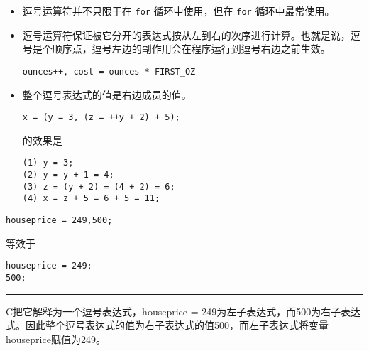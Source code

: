 \begin{frame}[fragile]\ft{\secname}
\begin{itemize}
\item
 逗号运算符并不只限于在 \lstinline|for| 循环中使用，但在 \lstinline|for| 循环中最常使用。
\end{itemize}
\end{frame}


\begin{frame}[fragile]\ft{\secname}
\begin{itemize}
\item
逗号运算符保证被它分开的表达式按从左到右的次序进行计算。也就是说，逗号是个顺序点，逗号左边的副作用会在程序运行到逗号右边之前生效。
\begin{lstlisting}
ounces++, cost = ounces * FIRST_OZ
\end{lstlisting}
\end{itemize}

\end{frame}

\begin{frame}[fragile]\ft{\secname}
\begin{itemize}
\item
整个逗号表达式的值是右边成员的值。
\begin{lstlisting}
x = (y = 3, (z = ++y + 2) + 5);
\end{lstlisting}
的效果是
\begin{lstlisting}
(1) y = 3;
(2) y = y + 1 = 4;
(3) z = (y + 2) = (4 + 2) = 6;
(4) x = z + 5 = 6 + 5 = 11;
\end{lstlisting}
\end{itemize}

\end{frame}

\begin{frame}[fragile]\ft{\secname}
\begin{lstlisting}
houseprice = 249,500;
\end{lstlisting}
等效于
\begin{lstlisting}
houseprice = 249;
500;
\end{lstlisting}
\rule{\textwidth}{1mm}\pause\vspace{0.1in}

C把它解释为一个逗号表达式，houseprice = 249为左子表达式，而500为右子表达式。因此整个逗号表达式的值为右子表达式的值500，而左子表达式将变量houseprice赋值为249。

\end{frame}

